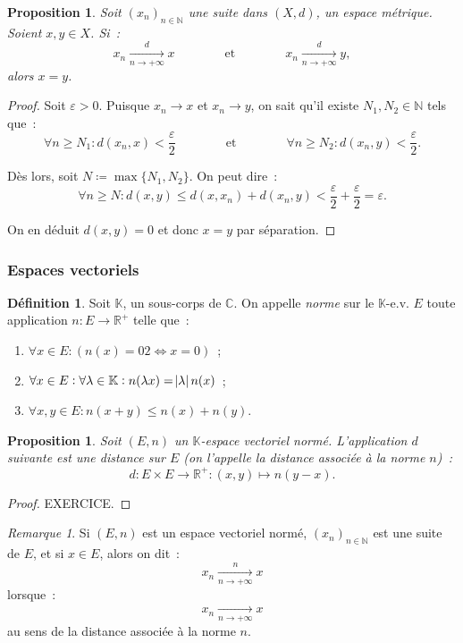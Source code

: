 \documentclass{report}
\newtheorem{prp}[thm]{Proposition}
\theoremstyle{definition}
\newtheorem{déf}[thm]{Définition}
\theoremstyle{remark}
\newtheorem*{rmq}{Remarque}
\newcommand{\K}{\mathbb K}
\newcommand{\C}{\mathbb C}
\newcommand{\R}{\mathbb R}
\newcommand{\Rp}{\R^{+}}
\newcommand{\N}{\mathbb N}
\newcommand{\seq}[3]{\left(#1_{#2}\right)_{#2 \in #3}}
\newcommand{\mconv}[3]{\xrightarrow[#1 \to #2]{#3}}
\newcommand{\pinfty}{{+\infty}}
\newcommand{\evn}{espace vectoriel normé}
\begin{document}
				\begin{prp} Soit $\seq xn\N$ une suite dans $(X, d)$, un espace métrique. Soient $x, y \in X$. Si~:
				\[x_n \mconv n\pinfty d x \qquad\qquad \text{et} \qquad\qquad x_n \mconv n\pinfty d y,\]
				alors $x = y$. \end{prp}

				\begin{proof} Soit $\varepsilon > 0$. Puisque $x_n \to x$ et $x_n \to y$, on sait qu'il existe $N_1, N_2 \in \N$ tels que~:
				\[\forall n \geq N_1 : d(x_n, x) < \frac \varepsilon2 \qquad\qquad \text{et} \qquad\qquad \forall n \geq N_2 : d(x_n, y) < \frac \varepsilon2.\]

				Dès lors, soit $N \coloneqq \max\{N_1, N_2\}$. On peut dire~:
				\[\forall n \geq N : d(x, y) \leq d(x, x_n) + d(x_n, y) < \frac \varepsilon2 + \frac \varepsilon2 = \varepsilon.\]

				On en déduit $d(x, y) = 0$ et donc $x = y$ par séparation. \end{proof}

			\subsubsection{Espaces vectoriels}
				\begin{déf} Soit $\K$, un sous-corps de $\C$. On appelle \textit{norme} sur le $\K$-e.v. $E$ toute application $n : E \to \Rp$ telle que~:

				\begin{enumerate}
					\item $\forall x \in E : \left(n(x) = 02 \iff x = 0\right)$~;
					\item $\forall x \in E : \forall \lambda \in \K : n(\lambda x) = \abs \lambda n(x)$~;
					\item $\forall x, y \in E : n(x + y) \leq n(x) + n(y)$.
				\end{enumerate}
				\end{déf}

				\begin{prp} Soit $(E, n)$ un $\K$-\evn. L'application $d$ suivante est une distance sur $E$ (on l'appelle la
				\textit{distance associée à la norme $n$})~:
				\[d : E \times E \to \Rp : (x, y) \mapsto n(y-x).\]
				\end{prp}

				\begin{proof} EXERCICE.
				\end{proof}

				\begin{rmq} Si $(E, n)$ est un \evn, $\seq xn\N$ est une suite de $E$, et si $x \in E$, alors on dit~:
				\[x_n \mconv n\pinfty n x\]
				lorsque~:
				\[x_n \mconv n\pinfty{} x\]
				au sens de la distance associée à la norme $n$.
				\end{rmq}
\end{document}
